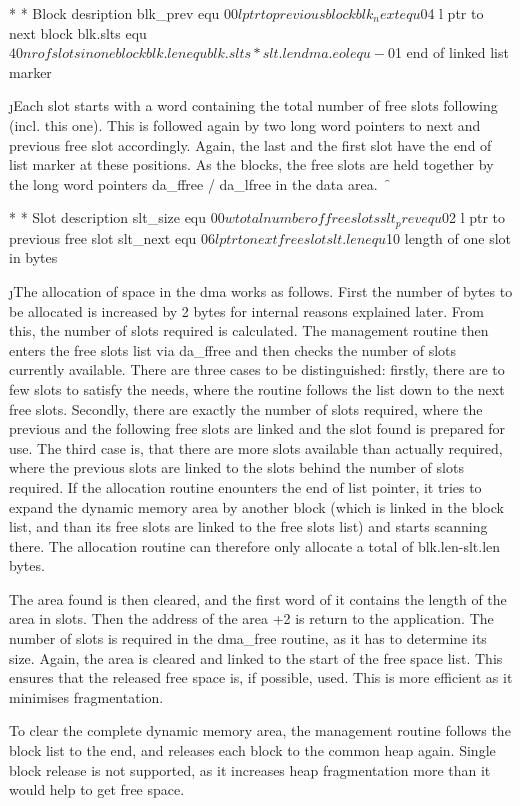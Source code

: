         *
        * Block desription
        blk_prev equ  $00       l ptr to previous block
        blk_next equ  $04       l ptr to next block
        blk.slts equ  $40         nr of slots in one block
        blk.len  equ  blk.slts * slt.len
        dma.eol  equ -$01         end of linked list marker


\j \pn Each slot starts with a word containing the total number of
free slots following (incl. this one). This is followed again
by two long word pointers to next and previous free slot accordingly.
Again, the last and the first slot have the end of list marker
at these positions. As the blocks, the free slots are held together
by the long word pointers da_ffree / da_lfree in the data area.

\f \mn


        *
        * Slot description
        slt_size equ  $00       w total number of free slots
        slt_prev equ  $02       l ptr to previous free slot
        slt_next equ  $06       l ptr to next free slot
        slt.len  equ  $10         length of one slot in bytes


\j \pn The allocation of space in the dma works as follows. First the
number of bytes to be allocated is increased by 2 bytes for internal
reasons explained later. From this, the number of slots required
is calculated. The management routine then enters the free slots
list via da_ffree and then checks the number of slots currently
available. There are three cases to be distinguished: firstly,
there are to few slots to satisfy the needs, where the routine
follows the list down to the next free slots. Secondly,
there are exactly the number of slots required, where the
previous and the following free slots are linked and the slot
found is prepared for use. The third case is, that there are more
slots available than actually required, where the previous slots
are linked to the slots behind the number of slots required.
If the allocation routine enounters the end of list pointer,
it tries to expand the dynamic memory area by another block (which
is linked in the block list, and than its free slots are linked to
the free slots list) and starts scanning there. The allocation routine
can therefore only allocate a total of blk.len-slt.len bytes.

The area found is then cleared, and the first word of it contains
the length of the area in slots. Then the address of the area +2 is
return to the application. The number of slots is required in the
dma_free routine, as it has to determine its size. Again, the area
is cleared and linked to the start of the free space list. This
ensures that the released free space is, if possible, used. This
is more efficient as it minimises fragmentation.

To clear the complete dynamic memory area, the management routine
follows the block list to the end, and releases each block to the
common heap again. Single block release is not supported, as it
increases heap fragmentation more than it would help to get free
space.
